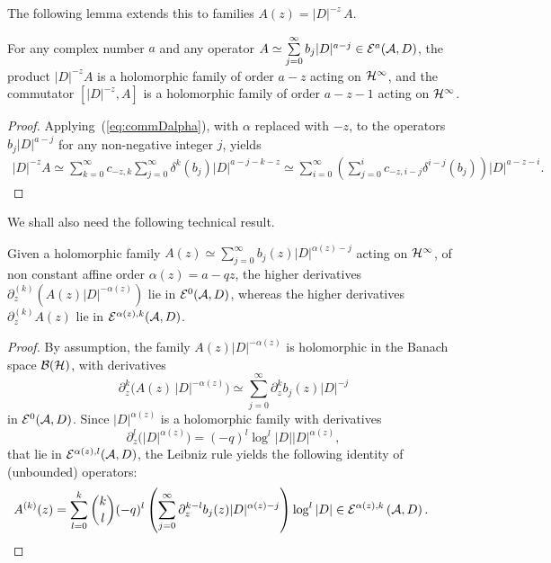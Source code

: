 \documentclass[pdftex]{sigma}
\numberwithin{equation}{section}
\begin{document}
The following lemma extends this to  families $A(z)=  \vert D\vert^{-z}\, A$.
\begin{lemma} For any complex number $a$ and any operator $ A\simeq \sum\limits_{j=0}^\infty
b_j \vert D\vert^{a-j}\in {\cal E}^a({\cal A}, D)$,  the product
$\vert D\vert^{-z}  A$ is a holomorphic family of order $a-z$ acting on ${\cal H}^\infty$, and the commutator $\left[\vert D\vert^{-z}, A\right]$ is a holomorphic family  of order $a-z-1$ acting on ${\cal H}^\infty$.
\end{lemma}

\begin{proof} Applying~(\ref{eq:commDalpha}), with
$\alpha$ replaced with $-z$,  to the operators $b_j  \vert D\vert^{a-j}$ for any non-negative integer $j$,  yields
\begin{gather*}
 \vert D\vert^{-z}  A \simeq  \sum_{k=0}^\infty c_{-z,k}
  \sum_{j=0}^\infty \delta^k(b_j)   \vert D\vert^{a-j-k-z}
 \simeq  \sum_{i=0}^\infty
 \left( \sum_{j=0}^i  c_{-z,i-j} \delta^{i-j}(b_j)\right)   \vert D\vert^{a-z-i}.\tag*{\qed}
\end{gather*}\renewcommand{\qed}{}
\end{proof}

We shall also need the following technical result.

\begin{proposition}\label{prop:Aprime}  Given a  holomorphic family $A(z)\simeq\sum\limits_{j=0}^\infty
b_j(z) \vert D\vert^{\alpha(z)-j}$  acting on ${\cal H}^\infty$, of non
  constant affine  order
  $\alpha(z)=a-q  z$, the higher   derivatives
 $\partial_z^{(k)}\left(  A(z) \vert D\vert^{-\alpha(z)}\right)$  lie
 in ${\cal E}^{0}({\cal A}, D)$, whereas   the higher   derivatives
 $\partial_z^{(k)} A(z)$  lie
 in ${\cal E}^{\alpha(z), k}({\cal A}, D)$.
\end{proposition}

\begin{proof} By assumption, the family  $A(z)  \vert D\vert^{-\alpha(z)}$ is
holomorphic in the Banach space ${\cal B}({\cal H})$, with derivatives
\[
\partial_z^k\big(A(z)\, \vert D\vert^{-\alpha(z)}\big)\simeq
\sum_{j=0}^\infty \partial_z^k b_j(z)   \vert D\vert^{-j}
\]
in ${\cal E}^0({\cal A}, D)$. Since  $\vert D\vert^{\alpha(z)}$ is a holomorphic
   family with derivatives
   \[
   \partial_z^l\big(\vert D\vert^{\alpha(z)}\big)=
   (-q)^l \log^l \vert D\vert  \vert D\vert^{\alpha(z)},
   \] that lie
in ${\cal E}^{\alpha(z), l}({\cal A }, D)$, the Leibniz rule yields the
following identity of (unbounded) operators:
\begin{gather*}
A^{(k)}(z)= \sum_{l=0}^k {k\choose l} (-q)^l
\left(\sum_{j=0}^\infty \partial_z^{k-l}b_j(z)   \vert D\vert^{\alpha(z)-j}\right)
\log^l \vert D\vert\in {\cal E}^{\alpha(z),k}\left({\cal A}, D\right).\tag*{\qed}
\end{gather*}
\renewcommand{\qed}{}
 \end{proof}
\end{document}
